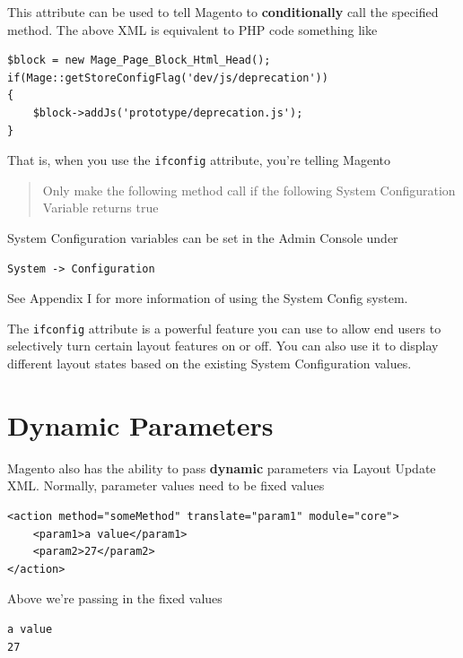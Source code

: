 \documentclass[oneside]{book}
\begin{document}
This attribute can be used to tell Magento to \textbf{conditionally} call the specified method. The above XML is equivalent to PHP code something like

\begin{lstlisting}
$block = new Mage_Page_Block_Html_Head();
if(Mage::getStoreConfigFlag('dev/js/deprecation'))
{
    $block->addJs('prototype/deprecation.js');
}

\end{lstlisting}


That is, when you use the \footnotesize\texttt{ifconfig} \normalsize  attribute, you're telling Magento 

\begin{quote}
Only make the following method call if the following System Configuration Variable returns true
\end{quote}

System Configuration variables can be set in the Admin Console under 

\begin{lstlisting}
System -> Configuration

\end{lstlisting}


See Appendix I for more information of using the System Config system.

The \footnotesize\texttt{ifconfig} \normalsize  attribute is a powerful feature you can use to allow end users to selectively turn certain layout features on or off.  You can also use it to display different layout states based on the existing System Configuration values.  

\section{Dynamic Parameters}

Magento also has the ability to pass \textbf{dynamic} parameters via Layout Update XML.  Normally, parameter values need to be fixed values

\begin{lstlisting}
<action method="someMethod" translate="param1" module="core">
    <param1>a value</param1>
    <param2>27</param2>         
</action>

\end{lstlisting}


Above we're passing in the fixed values

\begin{lstlisting}
a value
27

\end{lstlisting}
\end{document}
